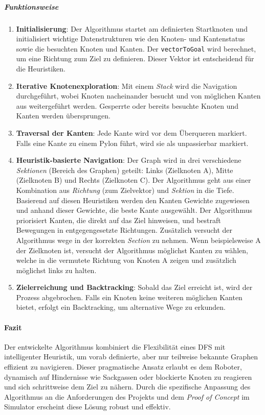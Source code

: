 \documentclass[main.tex]{subfiles} %
\begin{document}
\subparagraph{Funktionsweise}
\begin{enumerate}
  \item \textbf{Initialisierung}:
    Der Algorithmus startet am definierten Startknoten und
    initialisiert wichtige Datenstrukturen wie den Knoten- und
    Kantenstatus sowie die besuchten Knoten und Kanten. Der
    \texttt{vectorToGoal} wird berechnet, um eine Richtung zum Ziel
    zu definieren. Dieser Vektor ist entscheidend für die Heuristiken.

  \item \textbf{Iterative Knotenexploration}:
    Mit einem \textit{Stack} wird die Navigation durchgeführt, wobei
    Knoten nacheinander besucht und von möglichen Kanten aus
    weitergeführt werden. Gesperrte oder bereits besuchte Knoten und
    Kanten werden übersprungen.

  \item \textbf{Traversal der Kanten}:
    Jede Kante wird vor dem Überqueren markiert. Falls eine Kante zu
    einem Pylon führt, wird sie als unpassierbar markiert.

  \item \textbf{Heuristik-basierte Navigation}:
    Der Graph wird in drei verschiedene \textit{Sektionen} (Bereich
    des Graphen) geteilt: Links (Zielknoten A), Mitte (Zielknoten B)
    und Rechts (Zielknoten C).
    Der Algorithmus geht aus einer Kombination aus \textit{Richtung}
    (zum Zielvektor) und \textit{Sektion} in die Tiefe.
    Basierend auf diesen Heuristiken werden den Kanten Gewichte
    zugewiesen und anhand dieser Gewichte, die beste Kante ausgewählt.
    Der Algorithmus priorisiert Kanten, die direkt auf das Ziel
    hinweisen, und bestraft Bewegungen in entgegengesetzte
    Richtungen. Zusätzlich versucht der Algorithmus wege in der
    korrekten \textit{Section} zu nehmen. Wenn beispielsweise A der
    Zielknoten ist, versucht der Algorithmus möglichst Kanten zu
    wählen, welche in die vermutete Richtung von Knoten A zeigen und
    zusätzlich möglichst links zu halten.

  \item \textbf{Zielerreichung und Backtracking}:
    Sobald das Ziel erreicht ist, wird der Prozess abgebrochen. Falls
    ein Knoten keine weiteren möglichen Kanten bietet, erfolgt ein
    Backtracking, um alternative Wege zu erkunden.
\end{enumerate}

\paragraph{Fazit}

Der entwickelte Algorithmus kombiniert die Flexibilität eines DFS mit
intelligenter Heuristik, um vorab definierte, aber nur teilweise
bekannte Graphen effizient zu navigieren. Dieser pragmatische Ansatz
erlaubt es dem Roboter, dynamisch auf Hindernisse wie Sackgassen oder
blockierte Knoten zu reagieren und sich schrittweise dem Ziel zu
nähern. Durch die spezifische Anpassung des Algorithmus an die
Anforderungen des Projekts und dem \textit{Proof of Concept} im
Simulator erscheint diese Lösung robust und effektiv.
\end{document}
